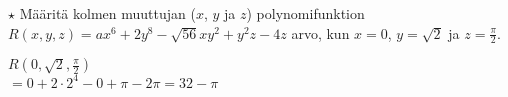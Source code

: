 \begin{tehtavasivu}

\begin{tehtava}
	$\star$ Määritä kolmen muuttujan ($x$, $y$ ja $z$) polynomifunktion $R(x,y,z)=ax^6+2y^8-\sqrt{56}xy^2+y^2z-4z$
	arvo, kun $x=0$, $y=\sqrt{2}$ ja $z=\frac{\pi}{2}$.
	\begin{vastaus}
	$R(0,\sqrt{2},\frac{\pi}{2})$ \\ $=0+2\cdot2^4-0+\pi-2\pi=32-\pi$
	\end{vastaus}
\end{tehtava}

\end{tehtavasivu}